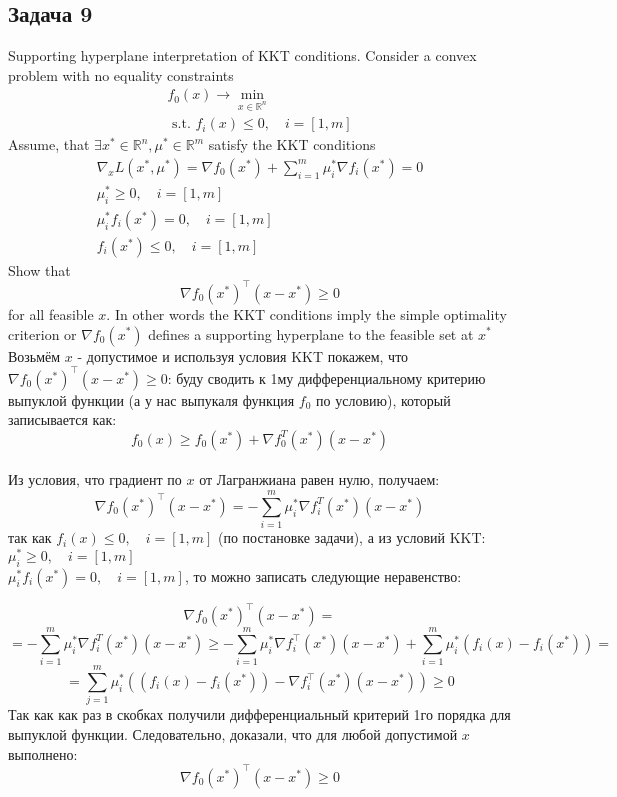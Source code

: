 \documentclass[a4paper,12pt]{article} %
\begin{document}
\subsection*{Задача 9}
Supporting hyperplane interpretation of KKT conditions. Consider a convex problem with no equality constraints
$$
\begin{array}{c}
f_{0}(x) \rightarrow \min _{x \in \mathbb{R}^{n}} \\
\text { s.t. } f_{i}(x) \leq 0, \quad i=[1, m]
\end{array}
$$
Assume, that $\exists x^{*} \in \mathbb{R}^{n}, \mu^{*} \in \mathbb{R}^{m}$ satisfy the KKT conditions
$$
\begin{array}{l}
\nabla_{x} L\left(x^{*}, \mu^{*}\right)=\nabla f_{0}\left(x^{*}\right)+\sum_{i=1}^{m} \mu_{i}^{*} \nabla f_{i}\left(x^{*}\right)=0 \\
\mu_{i}^{*} \geq 0, \quad i=[1, m] \\
\mu_{i}^{*} f_{i}\left(x^{*}\right)=0, \quad i=[1, m] \\
f_{i}\left(x^{*}\right) \leq 0, \quad i=[1, m]
\end{array}
$$
Show that
$$
\nabla f_{0}\left(x^{*}\right)^{\top}\left(x-x^{*}\right) \geq 0
$$
for all feasible $x$. In other words the KKT conditions imply the simple optimality criterion or $\nabla f_{0}\left(x^{*}\right)$ defines a supporting hyperplane to the feasible set at $x^{*}$\\

Возьмём $ x $ - допустимое и используя условия KKT покажем, что $ \nabla f_{0}\left(x^{*}\right)^{\top}\left(x-x^{*}\right) \geq 0 $: буду сводить к 1му дифференциальному критерию выпуклой функции (а у нас выпукаля функция $ f_0 $ по условию), который записывается как: 
$$
f_0(x) \geq f_0(x^*)+\nabla f_0^{T}(x^*)(x-x^*)
$$
\\
Из условия, что градиент по $ x $ от Лагранжиана равен нулю, получаем: 
$$
\nabla f_{0}\left(x^{*}\right)^{\top}\left(x-x^{*}\right) = - \sum_{i=1}^{m} \mu_{i}^{*} \nabla f_{i}^{T}\left(x^{*}\right) \left(x-x^{*}\right)
$$
так как $ f_{i}(x) \leq 0, \quad i=[1, m] $ (по постановке задачи), а из условий KKT:\\
$ \mu_{i}^{*} \geq 0, \quad i=[1, m] $ \\
$ \mu_{i}^{*} f_{i}\left(x^{*}\right)=0, \quad i=[1, m] $, то можно записать следующие неравенство: 

$$
\nabla f_{0}\left(x^{*}\right)^{\top}\left(x-x^{*}\right) =
$$
$$
 = - \sum_{i=1}^{m} \mu_{i}^{*} \nabla f_{i}^{T}\left(x^{*}\right) \left(x-x^{*}\right) \geqslant-\sum_{i=1}^{m} \mu_{i}^{*} \nabla f_{i}^{\top}\left(x^{*}\right)\left(x-x^{*}\right)+\sum_{i=1}^{m} \mu_{i}^{*}\left(f_{i}(x)-f_{i}\left(x^{*}\right)\right)=
$$
$$
=\sum_{j=1}^{m} \mu_{i}^{*}\left(\left(f_{i}(x)-f_{i}\left(x^{*}\right)\right)-\nabla f_{i}^{\top}\left(x^{*}\right)\left(x-x^{*}\right)\right) \geqslant 0
$$
Так как как раз в скобках получили дифференциальный критерий 1го порядка для выпуклой функции. Следовательно, доказали, что для любой допустимой $ x $ выполнено:
$$
\nabla f_{0}\left(x^{*}\right)^{\top}\left(x-x^{*}\right) \geq 0
$$
\end{document}
